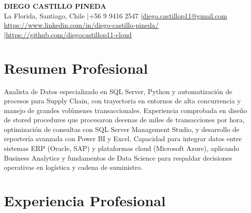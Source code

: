 \documentclass[11pt,letterpaper]{article}
\begin{document}
\begin{center}
{\fontsize{16}{19}\selectfont\textbf{\MakeUppercase{Diego Castillo Pineda}}}\\[4pt]
{\small La Florida, Santiago, Chile \quad|\quad +56 9 9416 2547 \quad|\quad \href{mailto:diego.castillop11@gmail.com}{diego.castillop11@gmail.com}\\
\href{https://https://www.linkedin.com/in/diego-castillo-pineda/}{https://www.linkedin.com/in/diego-castillo-pineda/} \quad|\quad \href{https://https://github.com/diegocastillop11-cloud}{https://github.com/diegocastillop11-cloud}}
\end{center}

\section{Resumen Profesional}
Analista de Datos especializado en SQL Server, Python y automatización de procesos para Supply Chain, con trayectoria en entornos de alta concurrencia y manejo de grandes volúmenes transaccionales. Experiencia comprobada en diseño de stored procedures que procesaron decenas de miles de transacciones por hora, optimización de consultas con SQL Server Management Studio, y desarrollo de reportería avanzada con Power BI y Excel. Capacidad para integrar datos entre sistemas ERP (Oracle, SAP) y plataformas cloud (Microsoft Azure), aplicando Business Analytics y fundamentos de Data Science para respaldar decisiones operativas en logística y cadena de suministro.

\section{Experiencia Profesional}
\end{document}
